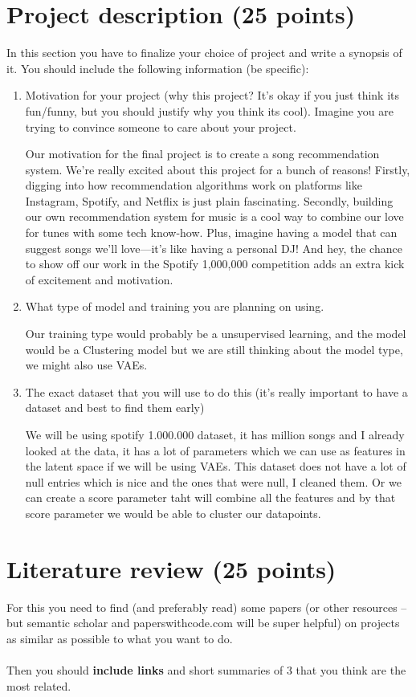 \documentclass{article}
\begin{document}
\section{Project description (25 points)}
In this section you have to finalize your choice of project and write a synopsis of it. You should include the following information (be specific):
\begin{enumerate}
    \item Motivation for your project (why this project? It's okay if you just think its fun/funny, but you should justify why you think its cool). Imagine you are trying to convince someone to care about your project.
    
    Our motivation for the final project is to create a song recommendation system. We're really excited about this project for a bunch of reasons! Firstly, digging into how recommendation algorithms work on platforms like Instagram, Spotify, and Netflix is just plain fascinating. Secondly, building our own recommendation system for music is a cool way to combine our love for tunes with some tech know-how. Plus, imagine having a model that can suggest songs we'll love—it's like having a personal DJ! And hey, the chance to show off our work in the Spotify 1,000,000 competition adds an extra kick of excitement and motivation.
    \item What type of model and training you are planning on using. 

    Our training type would probably be a unsupervised learning, and the model would be a Clustering model but we are still thinking about the model type, we might also use VAEs.
    
    \item The exact dataset that you will use to do this (it's really important to have a dataset and best to find them early)

    We will be using spotify 1.000.000 dataset, it has million songs and I already looked at the data, it has a lot of parameters which we can use as features in the latent space if we will be using VAEs. This dataset does not have a lot of null entries which is nice and the ones that were null, I cleaned them. Or we can create a score parameter taht will combine all the features and by that score parameter we would be able to cluster our datapoints.

    
\end{enumerate}

\section{Literature review (25 points)}
For this you need to find (and preferably read) some papers (or other resources -- but semantic scholar and paperswithcode.com will be super helpful) on projects as similar as possible to what you want to do. \\ \\
Then you should \textbf{include links} and short summaries of 3 that you think are the most related. 
\end{document}
